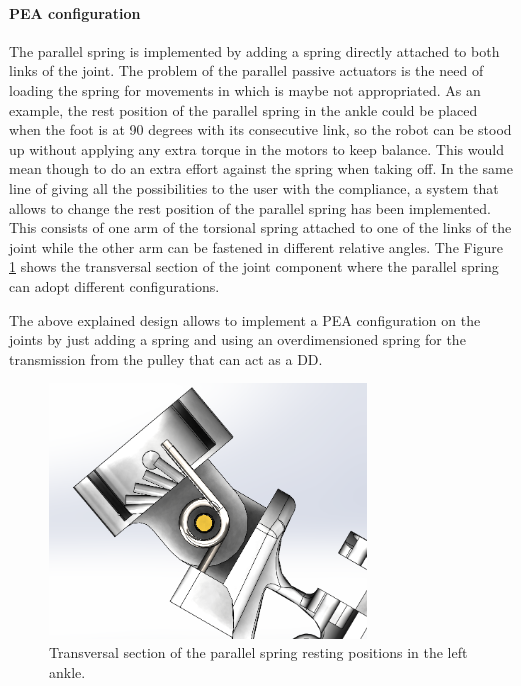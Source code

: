 \paragraph{PEA configuration} %
\label{para:pea_configuration}

The parallel spring is implemented by adding a spring directly attached to both links of the joint.
The problem of the parallel passive actuators is the need of loading the spring for movements in which is maybe not appropriated.
As an example, the rest position of the parallel spring in the ankle could be placed when the foot is at 90 degrees with its consecutive link, so the robot can be stood up without applying any extra torque in the motors to keep balance.
This would mean though to do an extra effort against the spring when taking off.
In the same line of giving all the possibilities to the user with the compliance, a system that allows to change the rest position of the parallel spring has been implemented.
This consists of one arm of the torsional spring attached to one of the links of the joint while the other arm can be fastened in different relative angles.
The Figure \ref{fig:rotational_spring_rest_position} shows the transversal section of the joint component where the parallel spring can adopt different configurations. 

The above explained design allows to implement a PEA configuration on the joints by just adding a spring and using an overdimensioned spring for the transmission from the pulley that can act as a DD.

\begin{figure}[ht!]
  \centering
  \includegraphics[width=0.75\textwidth]{figures/rotational_spring_rest_positions}
  \caption{Transversal section of the parallel spring resting positions in the left ankle.}
  \label{fig:rotational_spring_rest_position}
\end{figure}

